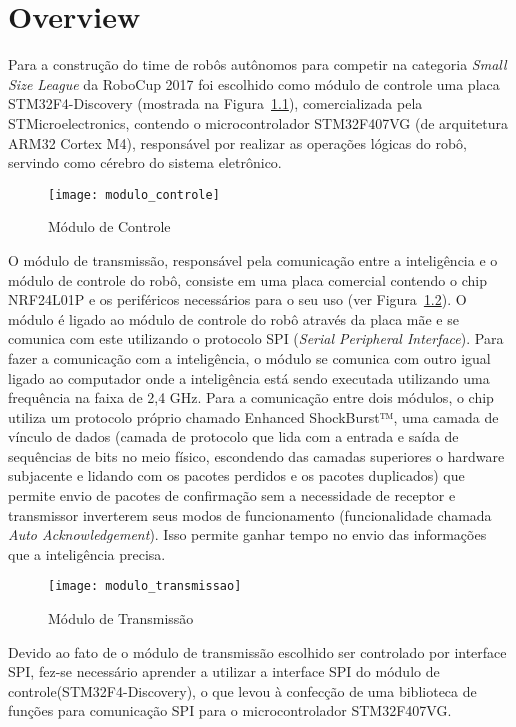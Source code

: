 \chapter{Overview}\label{cap:overview}

Para a construção do time de robôs autônomos para competir na categoria \textit{Small Size League}  da RoboCup 2017 foi escolhido como módulo de controle uma placa STM32F4-Discovery (mostrada na Figura~\ref{fig:modulo_controle}), comercializada pela STMicroelectronics, contendo o microcontrolador STM32F407VG (de arquitetura ARM32 Cortex M4), responsável por realizar as operações lógicas do robô, servindo como cérebro do sistema eletrônico.

\begin{figure}[H]
  \centering
  \texttt{[image: modulo\_controle]}
  \caption{Módulo de Controle}\label{fig:modulo_controle}
\end{figure}

O módulo de transmissão, responsável pela comunicação entre a inteligência e o módulo de controle do robô, consiste em uma placa comercial contendo o chip NRF24L01P e os periféricos necessários para o seu uso (ver Figura~\ref{fig:modulo_transmissao}). O módulo é ligado ao módulo de controle do robô através da placa mãe e se comunica com este utilizando o protocolo SPI (\textit{Serial Peripheral Interface}). Para fazer a comunicação com a inteligência, o módulo se comunica com outro igual ligado ao computador onde a inteligência está sendo executada utilizando uma frequência na faixa de 2,4 GHz. Para a comunicação entre dois módulos, o chip utiliza um protocolo próprio chamado Enhanced ShockBurst™, uma camada de vínculo de dados (camada de protocolo que lida com a entrada e saída de sequências de bits no meio físico, escondendo das camadas superiores o hardware subjacente e lidando com os pacotes perdidos e os pacotes duplicados) que permite envio de pacotes de confirmação sem a necessidade de receptor e transmissor inverterem seus modos de funcionamento (funcionalidade chamada \textit{Auto Acknowledgement}).
Isso permite ganhar tempo no envio das informações que a inteligência precisa.

\begin{figure}[H]
  \centering
  \texttt{[image: modulo\_transmissao]}
  \caption{Módulo de Transmissão}\label{fig:modulo_transmissao}
\end{figure}

Devido ao fato de o módulo de transmissão escolhido ser controlado por interface SPI, fez-se necessário aprender a utilizar a interface SPI do módulo de controle(STM32F4-Discovery), o que levou à confecção de uma  biblioteca de funções para comunicação SPI para o microcontrolador STM32F407VG.


